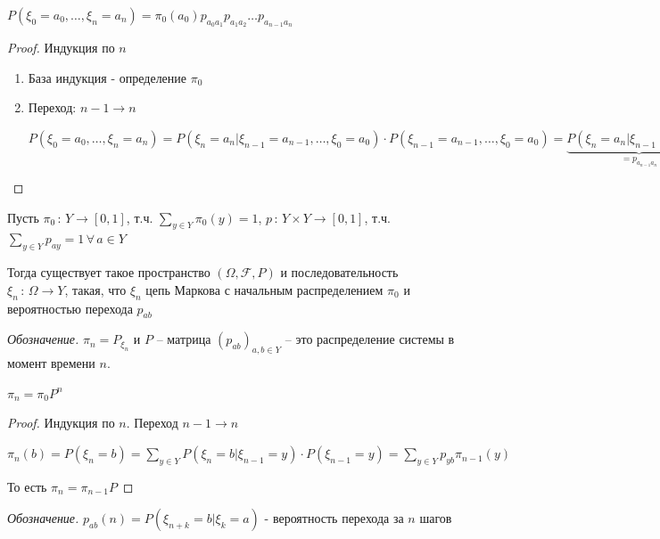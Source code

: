 \begin{theorem}
    $P(\xi_0 = a_0, \ldots, \xi_n = a_n) = \pi_0(a_0)p_{a_0a_1}p_{a_1a_2}\ldots p_{a_{n-1}a_n}$
\end{theorem}

\begin{proof}
    Индукция по $n$

    \begin{enumerate}
        \item База индукция - определение $\pi_0$
        \item {
            Переход: $n - 1 \to n$

            $P(\xi_0 = a_0, \ldots, \xi_n = a_n) = P(\xi_n = a_n | \xi_{n - 1} = a_{n-1}, \ldots, \xi_0 = a_0) \cdot P(\xi_{n - 1} = a_{n-1}, \ldots, \xi_0 = a_0) 
            = \underbrace{P(\xi_n = a_n | \xi_{n - 1} = a_{n-1})}_{=p_{a_{n-1}a_n}} \cdot \pi_0 (a_0) p_{a_0a_1} \ldots p_{a_{n-2}a_{n-1}}$
        }
    \end{enumerate}
\end{proof}

\begin{theorem}
    Пусть $\pi_0 \, : \, Y \to [0, 1]$, т.ч. $\sum\limits_{y \in Y} \pi_0 (y) = 1$, $p \, : \, Y \times Y \to [0, 1]$, т.ч.
    $\sum\limits_{y \in Y} p_{ay} = 1 \, \forall \, a \in Y$

    Тогда существует такое пространство $(\Omega, \mathcal{F}, P)$ и последовательность $\xi_n \, : \, \Omega \to Y$, такая, что
    $\xi_n$ цепь Маркова с начальным распределением $\pi_0$ и вероятностью перехода $p_{ab}$
\end{theorem}

\textit{Обозначение. } $\pi_n = P_{\xi_n}$ и $P$ -- матрица $(p_{ab})_{a, b \in Y}$ -- это распределение системы в момент времени $n$.

\begin{theorem}
    $\pi_n = \pi_0 P^n$
\end{theorem}

\begin{proof}
    Индукция по $n$. Переход $n-1 \to n$

    $\pi_n (b) = P(\xi_n = b) = \sum\limits_{y \in Y} P(\xi_n = b | \xi_{n-1} = y) \cdot P(\xi_{n-1} = y) = \sum\limits_{y \in Y}p_{yb} \pi_{n-1}(y)$

    То есть $\pi_n = \pi_{n-1} P$
\end{proof}

\textit{Обозначение. } $p_{ab} (n) = P(\xi_{n + k} = b | \xi_k = a)$ - вероятность перехода за $n$ шагов

